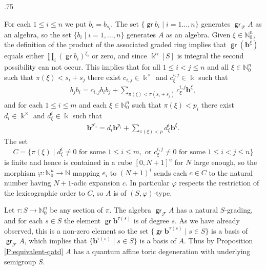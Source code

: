\documentclass[11pt,fleqn]{article}
\makeatletter
\renewenvironment{proof}[1][\textit{Proof}]{\par
  \pushQED{\qed}%
  \normalfont \topsep.75\paraskip\relax
  \trivlist
  \item[\hskip\labelsep
        \itshape
    #1\@addpunct{.}]\ignorespaces
}{%
  \popQED\endtrivlist\@endpefalse
}
\newcommand\NN{\mathbb N}
\renewcommand\to{\longrightarrow}
\renewcommand\phi{\varphi}
\newcommand\F{\mathcal F}
\renewcommand\b{\mathbf b}
\renewcommand\k{\Bbbk}
\DeclareMathOperator\gr{\mathsf{gr}}
\makeatother
\begin{document}
\begin{proof}
For each $1 \leq i \leq n$ we put $b_i = b_{s_i}$. The set $\{\gr b_i \mid i = 1 \ldots, 
n\}$ generates $\gr_\F A$ as an algebra, so the set $\{b_i \mid i = 1, \ldots, n\}$ 
generates $A$ as an algebra. Given $\xi \in \NN_0^n$, the definition of the product of 
the associated graded ring implies that $\gr (\b^\xi)$ equals either $\prod_i(\gr 
b_i)^{\xi_i}$ or zero, and since $\k^\alpha[S]$ is integral the second possibility can 
not occur. This implies that for all $1 \leq i < j \leq n$ and all $\xi \in \NN_0^n$ 
such that $\pi(\xi) < s_i +s_j$ there exist $c_{i,j} \in \k^\times$ and $c^{i,j}_\xi \in 
\k$ such that
\begin{align*}
  b_j b_i = c_{i,j} b_i b_j + \sum_{\pi(\xi) < \pi(s_i + s_j)} c^{i,j}_\xi
    \b^\xi,
\end{align*}
and for each $1 \leq i \leq m$ and each $\xi \in \NN_0^n$ such that $\pi(\xi) < p_i$ 
there exist $d_i \in \k^\times$ and $d^i_\xi \in \k$ such that
\begin{align*}
  \b^{p'_i} = d_i \b^{p_i} + \sum_{\pi(\xi) < p} d^i_\xi \b^\xi.
\end{align*}
The set 
\[
  C 
    =\{\pi(\xi) \mid d^i_\xi \neq 0 \mbox{ for some } 1 \leq i \leq m, 
      \mbox{ or } c^{i,j}_\xi \neq 0 \mbox{ for some $1 \leq i < j \leq n$}\}
\]
is finite and hence is contained in a cube $[0,N+1]^u$ for $N$ large enough, so the 
morphism $\phi: \NN_0^u \to \NN$ mapping $e_i$ to $(N+1)^i$ sends each $c \in C$ to 
the natural number having $N+1$-adic expansion $c$. In particular $\phi$ respects the 
restriction of the lexicographic order to $C$, so $A$ is of $(S,\phi)$-type. 

Let $\tau: S \to \NN_0^n$ be any section of $\pi$. The algebra $\gr_\F A$ has a natural 
$S$-grading, and for each $s \in S$ the element $\gr \b^{\tau(s)}$ is of degree $s$. As 
we have already observed, this is a non-zero element so the set $\{\gr \b^{\tau(s)} \mid 
s \in S\}$ is a basis of $\gr_\F A$, which implies that $\{\b^{\tau(s)} \mid s \in S\}$ 
is a basis of $A$. Thus by Proposition \ref{P:equivalent-qatd} $A$ has a quantum affine 
toric degeneration with underlying semigroup $S$.
\end{proof}
\end{document}
